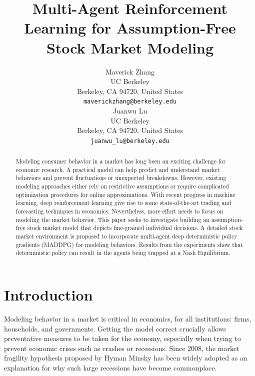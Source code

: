\documentclass{article}
\title{%
    Multi-Agent Reinforcement Learning for Assumption-Free Stock Market Modeling
}
\author{ \hspace{1mm}Maverick Zhang\\
	UC Berkeley\\
        Berkeley, CA 94720, United States \\
	\texttt{maverickzhang@berkeley.edu} \\
	\And
	\hspace{1mm}Juanwu Lu \\
	UC Berkeley \\
        Berkeley, CA 94720, United States \\
	\texttt{juanwu\_lu@berkeley.edu} \\
}
\date{}
\begin{document}
\maketitle


\begin{abstract}
    Modeling consumer behavior in a market has long been an exciting challenge for economic research. A practical model can help predict and understand market behaviors and prevent fluctuations or unexpected breakdowns. However, existing modeling approaches either rely on restrictive assumptions or require complicated optimization procedures for online approximations. With recent progress in machine learning, deep reinforcement learning give rise to some state-of-the-art trading and forecasting techniques in economics. Nevertheless, more effort needs to focus on modeling the market behavior. This paper seeks to investigate building an assumption-free stock market model that depicts fine-grained individual decisions. A detailed stock market environment is proposed to incorporate multi-agent deep deterministic policy gradients (MADDPG) for modeling behaviors. Results from the experiments show that deterministic policy can result in the agents being trapped at a Nash Equilibrium.
\end{abstract}


\section{Introduction}
Modeling behavior in a market is critical in economics, for all institutions: firms, households, and governments. Getting the model correct crucially allows preventative measures to be taken for the economy, especially when trying to prevent economic crises such as crashes or recessions. Since 2008, the market fragility hypothesis proposed by Hyman Minsky has been widely adopted \cite{minsky1992instability} as an explanation for why such large recessions have become commonplace. 
\end{document}
